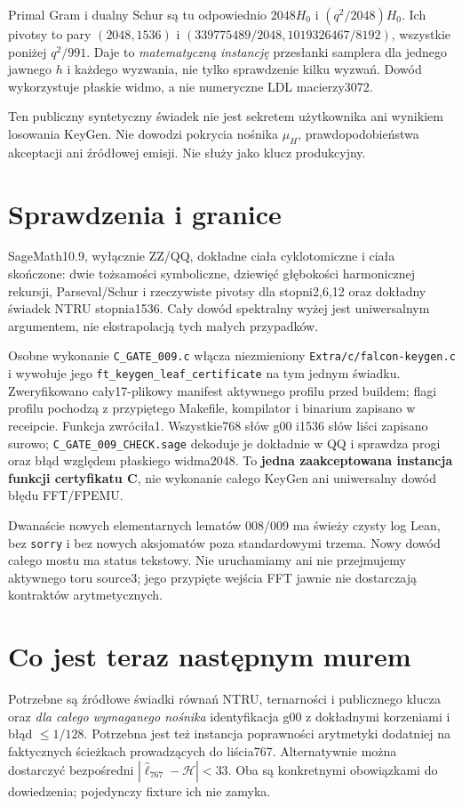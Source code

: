 \documentclass[11pt,a4paper]{article}
\newcommand{\code}[1]{\nolinkurl{#1}}
\newcommand{\HH}{\mathcal H}\newtheorem{theorem}{Twierdzenie}
\begin{document}
Primal Gram i dualny Schur są tu odpowiednio $2048H_0$ i
$(q^2/2048)H_0$. Ich pivotsy to pary $(2048,1536)$ i
$(339775489/2048,1019326467/8192)$, wszystkie poniżej $q^2/991$.
Daje to \emph{matematyczną instancję} przesłanki samplera dla jednego
jawnego $h$ i każdego wyzwania, nie tylko sprawdzenie kilku wyzwań.
Dowód wykorzystuje płaskie widmo, a nie numeryczne LDL macierzy3072.

Ten publiczny syntetyczny świadek nie jest sekretem użytkownika ani wynikiem
losowania KeyGen. Nie dowodzi pokrycia nośnika $\mu_H$, prawdopodobieństwa
akceptacji ani źródłowej emisji. Nie służy jako klucz produkcyjny.

\section{Sprawdzenia i granice}
SageMath10.9, wyłącznie ZZ/QQ, dokładne ciała cyklotomiczne i ciała skończone:
dwie tożsamości symboliczne, dziewięć głębokości harmonicznej rekursji,
Parseval/Schur i rzeczywiste pivotsy dla stopni2,6,12 oraz dokładny
świadek NTRU stopnia1536. Cały dowód spektralny wyżej jest uniwersalnym
argumentem, nie ekstrapolacją tych małych przypadków.

Osobne wykonanie \code{C_GATE_009.c} włącza niezmieniony
\code{Extra/c/falcon-keygen.c} i wywołuje jego
\code{ft_keygen_leaf_certificate} na tym jednym świadku.
Zweryfikowano cały17-plikowy manifest aktywnego profilu przed buildem;
flagi profilu pochodzą z przypiętego Makefile, kompilator i binarium
zapisano w receipcie. Funkcja zwróciła1. Wszystkie768 słów g00 i1536 słów
liści zapisano surowo; \code{C_GATE_009_CHECK.sage} dekoduje je dokładnie
w QQ i sprawdza progi oraz błąd względem płaskiego widma2048.
To \textbf{jedna zaakceptowana instancja funkcji certyfikatu C}, nie wykonanie
całego KeyGen ani uniwersalny dowód błędu FFT/FPEMU.

Dwanaście nowych elementarnych lematów 008/009 ma świeży czysty log Lean,
bez \code{sorry} i bez nowych aksjomatów poza standardowymi trzema.
Nowy dowód całego mostu ma status tekstowy. Nie uruchamiamy ani nie
przejmujemy aktywnego toru source3; jego przypięte wejścia FFT jawnie
nie dostarczają kontraktów arytmetycznych.

\section{Co jest teraz następnym murem}
Potrzebne są źródłowe świadki równań NTRU, ternarności i publicznego klucza
oraz \emph{dla całego wymaganego nośnika} identyfikacja g00 z dokładnymi
korzeniami i błąd $\le1/128$. Potrzebna jest też instancja poprawności
arytmetyki dodatniej na faktycznych ścieżkach prowadzących do liścia767.
Alternatywnie można dostarczyć bezpośredni $|\widehat\ell_{767}-\HH|<33$.
Oba są konkretnymi obowiązkami do dowiedzenia; pojedynczy fixture ich nie zamyka.
\end{document}
